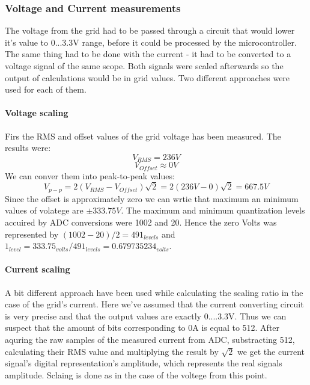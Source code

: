 \subsubsection{Voltage and Current measurements}
The voltage from the grid had to be passed through a circuit that would lower it's value to 0...3.3V range, before it could be processed by the microcontroller. The same thing had to be done with the current - it had to be converted to a voltage signal of the same scope. Both signals were scaled afterwards so the output of calculations would be in grid values. Two different approaches were used for each of them.

\paragraph{Voltage scaling}
Firs the RMS and offset values of the grid voltage has been measured. The results were: 
\[ V_{RMS}=236V \] 
\[ V_{Offset} \approx 0V\]
We can conver them into peak-to-peak values:
\[ V_{p-p}=2(V_{RMS}-V_{Offset})\sqrt{2}=2(236V-0)\sqrt{2}=667.5V \]
Since the offset is approximately zero we can wrtie that maximum an minimum values of volatege are $ \pm333.75V $. The maximum and minimum quantization levels accuired by ADC conversions were 1002 and 20. Hence the zero Volts was represented by $ (1002-20)/2=491_{levels} $ and $ 1_{level}=333.75_{volts}/491_{levels}=0.679735234_{volts} $.

\paragraph{Current scaling}
A bit different approach have been used while calculating the scaling ratio in the case of the grid's current. Here we've assumed that the current converting circuit is very precise and that the output values are exactly 0....3.3V. Thus we can suspect that the amount of bits corresponding to 0A is equal to 512. After aquring the raw samples of the measured current from ADC, substracting 512, calculating their RMS value and multiplying the result by $ \sqrt{2} $ we get the current signal's digital representation's amplitude, which represents the real signals amplitude. Sclaing is done as in the case of the voltege from this point.

